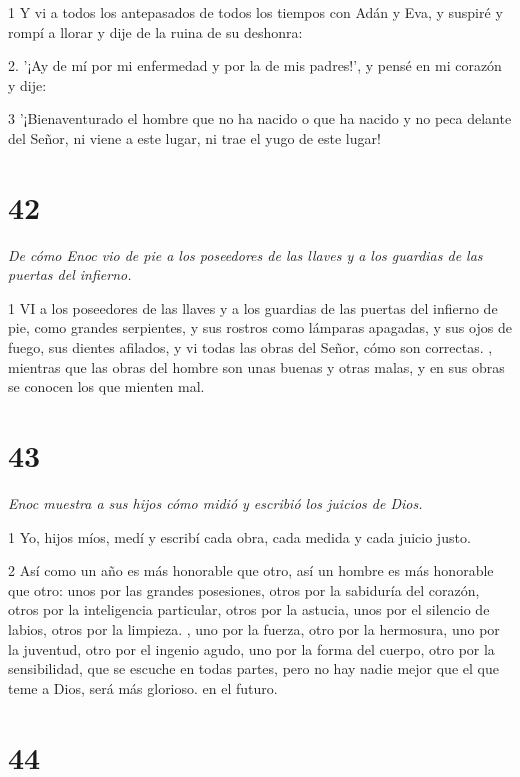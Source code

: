\par 1 Y vi a todos los antepasados ​​de todos los tiempos con Adán y Eva, y suspiré y rompí a llorar y dije de la ruina de su deshonra:

2. '¡Ay de mí por mi enfermedad y por la de mis padres!', y pensé en mi corazón y dije:

\par 3 '¡Bienaventurado el hombre que no ha nacido o que ha nacido y no peca delante del Señor, ni viene a este lugar, ni trae el yugo de este lugar!

\chapter{42}

\par \textit{De cómo Enoc vio de pie a los poseedores de las llaves y a los guardias de las puertas del infierno.}

\par 1 VI a los poseedores de las llaves y a los guardias de las puertas del infierno de pie, como grandes serpientes, y sus rostros como lámparas apagadas, y sus ojos de fuego, sus dientes afilados, y vi todas las obras del Señor, cómo son correctas. , mientras que las obras del hombre son unas buenas y otras malas, y en sus obras se conocen los que mienten mal.

\chapter{43}

\par \textit{Enoc muestra a sus hijos cómo midió y escribió los juicios de Dios.}

\par 1 Yo, hijos míos, medí y escribí cada obra, cada medida y cada juicio justo.

\par 2 Así como un año es más honorable que otro, así un hombre es más honorable que otro: unos por las grandes posesiones, otros por la sabiduría del corazón, otros por la inteligencia particular, otros por la astucia, unos por el silencio de labios, otros por la limpieza. , uno por la fuerza, otro por la hermosura, uno por la juventud, otro por el ingenio agudo, uno por la forma del cuerpo, otro por la sensibilidad, que se escuche en todas partes, pero no hay nadie mejor que el que teme a Dios, será más glorioso. en el futuro.

\chapter{44}

